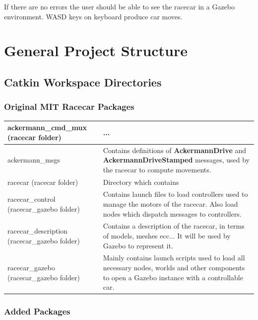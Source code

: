 \documentclass[12pt, letterpaper]{report}
\begin{document}
If there are no errors the user should be able to see the racecar in a Gazebo environment. WASD keys on keyboard produce car moves.

\chapter{General Project Structure}

\section{Catkin Workspace Directories}

\subsection{Original MIT Racecar Packages}

\begin{center}
	\begin{tabularx}{\textwidth}{
			| >{\raggedright\arraybackslash}X
			| >{\arraybackslash}X |
		}
		\hline
		ackermann\_cmd\_mux (racecar folder) & ... \\
		\hline
		ackermann\_msgs & Contains definitions of \textbf{AckermannDrive} and \textbf{AckermannDriveStamped} messages, used by the racecar to compute movements. \\
		\hline
		racecar (racecar folder) & Directory which contains \\
		\hline
		racecar\_control (racecar\_gazebo folder) & Contains launch files to load controllers used to manage the motors of the racecar. Also load nodes which dispatch messages to controllers. \\
		\hline
		racecar\_description (racecar\_gazebo folder) & Contains a description of the racecar, in terms of models, meshes ecc... It will be used by Gazebo to represent it. \\
		\hline
		racecar\_gazebo (racecar\_gazebo folder) & Mainly contains launch scripts used to load all necessary nodes, worlds and other components to open a Gazebo instance with a controllable car. \\
		\hline
	\end{tabularx}
\end{center}

\subsection{Added Packages}
\end{document}
